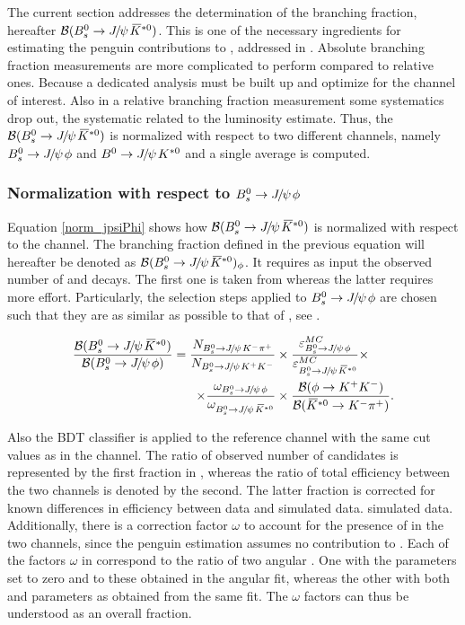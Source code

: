 
The current section addresses the determination of the \BsJpsiKst branching fraction, hereafter $\BRof\BsJpsiKst$.
This is one of the necessary ingredients for estimating the penguin contributions to \phis, addressed in .
Absolute branching fraction measurements are more complicated to perform compared to relative ones. Because a
dedicated analysis must be built up and optimize for the channel of interest. Also in a relative branching fraction
measurement some systematics drop out, \ie the systematic related to the luminosity estimate. Thus, the $\BRof\BsJpsiKst$ is
normalized with respect to two different channels, namely $\BsJpsiPhi$ and $\BdJpsiKst$ and a single average is computed.

\subsubsection{Normalization with respect to $\BsJpsiPhi$}
Equation \ref{norm_jpsiPhi} shows how $\BRof\BsJpsiKst$ is normalized with respect to the \BsJpsiPhi channel.
The branching fraction defined in the previous equation will hereafter be denoted as $\BRof{\BsJpsiKst}_\Pphi$.
It requires as input the observed number of \BsJpsiKst and \BsJpsiPhi decays. The first one is taken from
 whereas the latter requires more effort. Particularly, the selection steps applied
to $\BsJpsiPhi$ are chosen such that they are as similar as possible to that of \BsJpsiKst, see .

\begin{align}
  \centering
\frac{\BRof\BsJpsiKst}{\BRof\BsJpsiPhi} = \frac{N_{\BsJpsiKpi}}{N_{\BsJpsiKK}}
                                  &\times \frac{\varepsilon_{\BsJpsiPhi}^{MC}}{\varepsilon_{\BsJpsiKst}^{MC}}
                                   \times \nonumber \\
                                  \times \frac{\omega_{\BsJpsiPhi}}{\omega_{\BsJpsiKst}}
                                  & \times \frac{\BRof{\Pphi\to\kaon^+\kaon^-}}{\BRof{\Kstarzb\to\kaon^-\pion^+}}.
\label{norm_jpsiPhi}
\end{align}

\noindent Also the BDT classifier is applied to the reference channel
with the same cut values as in the \BsJpsiKst channel. The ratio of observed number of candidates is represented by the
first fraction in , whereas the ratio of total efficiency between the two channels is denoted
by the second. The latter fraction is corrected for known differences in efficiency between data and simulated data.
simulated data. Additionally, there is a correction factor $\omega$ to account for the presence of \swave in the two
channels, since the penguin estimation assumes no \swave contribution to \BsJpsiKst. Each of the factors $\omega$ in
 correspond to the ratio of two angular \pdfs. One with the \swave parameters set to zero and
\pwave to these obtained in the angular fit,  whereas the other with both \pwave and \swave parameters as obtained
from the same fit. The $\omega$ factors can thus be understood as an overall \swave fraction.


